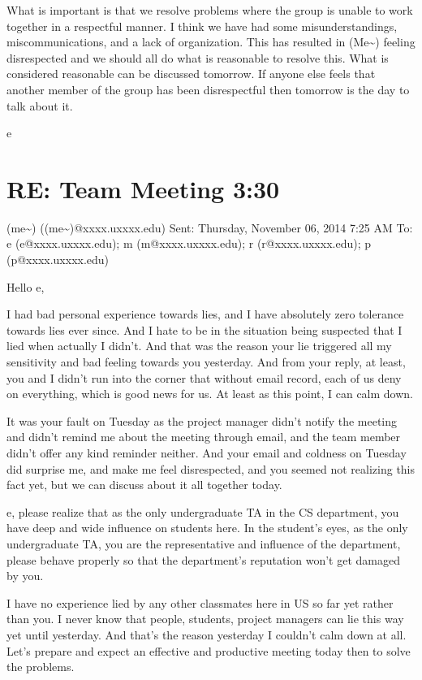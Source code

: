 \documentclass[12pt]{book}
\begin{document}
What is important is that we resolve problems where the group is unable to work together in a respectful manner. I think we have had some misunderstandings, miscommunications, and a lack of organization. This has resulted in (Me\textasciitilde{}) feeling disrespected and we should all do what is reasonable to resolve this. What is considered reasonable can be discussed tomorrow. If anyone else feels that another member of the group has been disrespectful then tomorrow is the day to talk about it. 

e

\section{RE: Team Meeting 3:30}
\label{sec-22-2}
(me\textasciitilde{}) ((me\textasciitilde{})@xxxx.uxxxx.edu)
Sent:        Thursday, November 06, 2014 7:25 AM
To:        
e (e@xxxx.uxxxx.edu); m (m@xxxx.uxxxx.edu); r (r@xxxx.uxxxx.edu); p (p@xxxx.uxxxx.edu)

Hello e,

I had bad personal experience towards lies, and I have absolutely zero tolerance towards lies ever since. And I hate to be in the situation being suspected that I lied when actually I didn't. And that was the reason your lie triggered all my sensitivity and bad feeling towards you yesterday. And from your reply, at least, you and I didn't run into the corner that without email record, each of us deny on everything, which is good news for us. At least as this point, I can calm down.

It was your fault on Tuesday as the project manager didn't notify the meeting and didn't remind me about the meeting through email, and the team member didn't offer any kind reminder neither. And your email and coldness on Tuesday did surprise me, and make me feel disrespected, and you seemed not realizing this fact yet, but we can discuss about it all together today. 

e, please realize that as the only undergraduate TA in the CS department, you have deep and wide influence on students here. In the student's eyes, as the only undergraduate TA, you are the representative and influence of the department, please behave properly so that the department's reputation won't get damaged by you. 

I have no experience lied by any other classmates here in US so far yet rather than you. I never know that people, students, project managers can lie this way yet until yesterday. And that's the reason yesterday I couldn't calm down at all. Let's prepare and expect an effective and productive meeting today then to solve the problems. 
\end{document}
